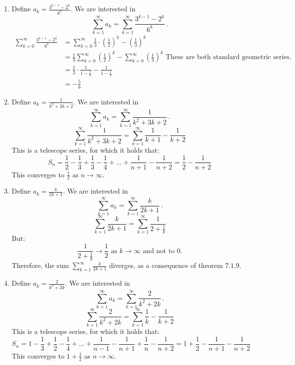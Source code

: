 \documentclass[week=5]{homework}
\begin{document}
\begin{questions}
\begin{enumerate}[label=(\alph*)]
	    	\item Define $a_k = \frac{3^{k-1} - 2^k}{6^k}$. We are interested in 
	    	\[
	    	\sum_{k=1}^{\infty} a_k = \sum_{k=1}^{\infty} \frac{3^{k-1} - 2^k}{6^k}\,.
	    	\]
	    	\begin{align*}
	    	\sum_{k = 0}^{\infty} \frac{3^{k-1} - 2^k}{6^k} &= \sum_{k = 0}^{\infty} \frac{1}{3} \cdot \left(\frac{1}{2} \right)^k - \left(\frac{1}{3} \right)^k \\
	    	&= \frac{1}{3} \sum_{k = 0}^{\infty} \left(\frac{1}{2} \right)^k - \sum_{k = 0}^{\infty} \left(\frac{1}{3} \right)^k \text{ These are both standard geometric series.}\\
	    	&= \frac{1}{3} \cdot \frac{1}{1 - \frac{1}{2}} - \frac{1}{1 - \frac{1}{3}} \\
	    	&= - \frac{5}{6}
	    	\end{align*}
	    	
	    	\item Define $a_k = \frac{1}{k^2 + 3k + 2}$. We are interested in 
	    	\[
	    	\sum_{k=1}^{\infty} a_k = \sum_{k=1}^{\infty} \frac{1}{k^2 + 3k + 2}\,.
	    	\]
	    	\[
	    	\sum_{k = 1}^{\infty} \frac{1}{k^2 + 3k + 2} = \sum_{k = 1}^{\infty} \frac{1}{k + 1} - \frac{1}{k + 2} 
	    	\]
	    	This is a telescope series, for which it holds that:
	    	\[
	    	S_n = \frac{1}{2} - \frac{1}{3} + \frac{1}{3} - \frac{1}{4} + ... + \frac{1}{n + 1} - \frac{1}{n + 2} = \frac{1}{2} - \frac{1}{n + 2}
	    	\]
	    	This converges to $\frac{1}{2}$ as $n \to \infty$.
	    	
	    	\addtocounter{enumi}{1}
	    	\item Define $a_k = \frac{k}{2k+1}$. We are interested in 
	    	\[
	    	\sum_{k=1}^{\infty} a_k = \sum_{k=1}^{\infty} \frac{k}{2k+1}\,.
	    	\]
	    	\[
	    	\sum_{k = 1}^{\infty} \frac{k}{2k + 1} = \sum_{k = 1}^{\infty} \frac{1}{2 + \frac{1}{k}}
	    	\]
	    	But:
	    	\[
	    	\frac{1}{2 + \frac{1}{k}} \to \frac{1}{2} \text{ as } k \to \infty \text{ and not to } 0.
	    	\]
	    	Therefore, the sum $\sum_{k = 1}^{\infty} \frac{k}{2k + 1}$ diverges, as a consequence of theorem $7.1.9$.
	    	
	    	\item Define $a_k = \frac{2}{k^2+2k}$. We are interested in 
	    	\[
	    	\sum_{k=1}^{\infty} a_k = \sum_{k=1}^{\infty} \frac{2}{k^2+2k}\,.
	    	\] 
	    	\[
	    	\sum_{k = 1}^{\infty} \frac{2}{k^2 + 2k} = \sum_{k = 1}^{\infty} \frac{1}{k} - \frac{1}{k + 2}
	    	\]
	    	This is a telescope series, for which it holds that:
	    	\[
	    	S_n =  1 - \frac{1}{3} + \frac{1}{2} - \frac{1}{4} + ... + \frac{1}{n - 1} - \frac{1}{n + 1} + \frac{1}{n} - \frac{1}{n + 2} = 1 + \frac{1}{2} - \frac{1}{n + 1} - \frac{1}{n + 2}
	    	\]
	    	This converges to $1 + \frac{1}{2}$ as $n \to \infty$.
	    	

\end{enumerate}
\end{questions}
\end{document}
